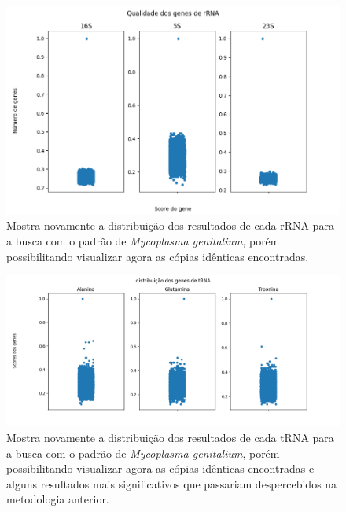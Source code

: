 \documentclass[brazilian,12pt,a4paper,final]{article}
\begin{document}
	\begin{figure}[hbtp]
		\begin{center}
			\includegraphics[width=15cm]{../Figures/DistribuiçãorRNA.png}
			\caption{Mostra novamente a distribuição dos resultados de cada rRNA para a busca com o padrão de \textit{Mycoplasma genitalium}, porém possibilitando visualizar agora as cópias idênticas encontradas.}
			\label{fig}
		\end{center}
	\end{figure}

	\begin{figure}[hbtp]
		\begin{center}
			\includegraphics[width=15cm]{../Figures/DistribuiçãotRNA.png}
			\caption{Mostra novamente a distribuição dos resultados de cada tRNA para a busca com o padrão de \textit{Mycoplasma genitalium}, porém possibilitando visualizar agora as cópias idênticas encontradas e alguns resultados mais significativos que passariam despercebidos na metodologia anterior.}
			\label{fig}
		\end{center}
	\end{figure}

	
\end{document}
